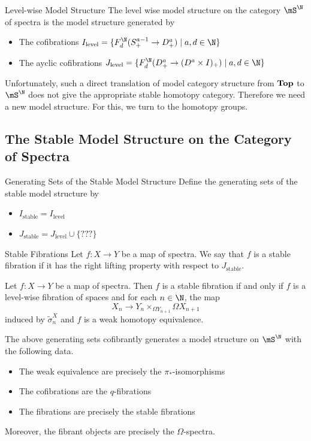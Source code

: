 \documentclass[a4paper]{article}
\begin{document}
\begin{defn}{Level-wise Model Structure}{} The level wise model structure on the category $\mS^\N$ of spectra is the model structure generated by 
\begin{itemize}
\item The cofibrations $I_\text{level}=\{F_d^\N(S_+^{a-1}\to D_+^a)\;|\;a,d\in\N\}$
\item The ayclic cofibrations $J_\text{level}=\{F_d^\N(D_+^a\to(D^a\times I)_+)\;|\;a,d\in\N\}$
\end{itemize}
\end{defn}

Unfortunately, such a direct translation of model category structure from $\bold{Top}$ to $\mS^\N$ does not give the appropriate stable homotopy category. Therefore we need a new model structure. For this, we turn to the homotopy groups. 

\subsection{The Stable Model Structure on the Category of Spectra}
\begin{defn}{Generating Sets of the Stable Model Structure}{} Define the generating sets of the stable model structure by
\begin{itemize}
\item $I_\text{stable}=I_\text{level}$
\item $J_\text{stable}=J_\text{level}\cup\{???\}$
\end{itemize}
\end{defn}

\begin{defn}{Stable Fibrations}{} Let $f:X\to Y$ be a map of spectra. We say that $f$ is a stable fibration if it has the right lifting property with respect to $J_\text{stable}$. 
\end{defn}

\begin{prp}{}{} Let $f:X\to Y$ be a map of spectra. Then $f$ is a stable fibration if and only if $f$ is a level-wise fibration of spaces and for each $n\in\N$, the map $$X_n\to Y_n\times_{\Omega Y_{n+1}}\Omega X_{n+1}$$ induced by $\widetilde{\sigma}_n^X$ and $f$ is a weak homotopy equivalence. 
\end{prp}

\begin{thm}{}{} The above generating sets cofibrantly generates a model structure on $\mS^\N$ with the following data. 
\begin{itemize}
\item The weak equivalence are precisely the $\pi_\ast$-isomorphisms
\item The cofibrations are the $q$-fibrations
\item The fibrations are precisely the stable fibrations
\end{itemize}
Moreover, the fibrant objects are precisely the $\Omega$-spectra. 
\end{thm}
\end{document}
